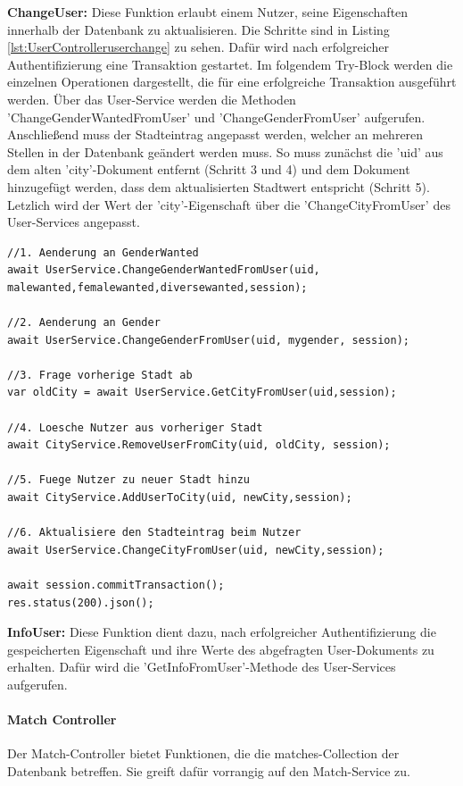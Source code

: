 \noindent
\textbf{ChangeUser:}
Diese Funktion erlaubt einem Nutzer, seine Eigenschaften innerhalb der Datenbank zu aktualisieren. Die Schritte sind in Listing \ref{lst:UserControlleruserchange} zu sehen. Dafür wird nach erfolgreicher Authentifizierung eine Transaktion gestartet. Im folgendem Try-Block werden die einzelnen Operationen dargestellt, die für eine erfolgreiche Transaktion ausgeführt werden. Über das User-Service werden die Methoden 'ChangeGenderWantedFromUser' und 'ChangeGenderFromUser' aufgerufen. Anschließend muss der Stadteintrag angepasst werden, welcher an  mehreren Stellen in der Datenbank geändert werden muss. 
So muss zunächst die 'uid' aus dem alten 'city'-Dokument entfernt (Schritt 3 und 4) und dem  Dokument hinzugefügt werden, dass dem aktualisierten Stadtwert entspricht (Schritt 5). Letzlich wird der Wert der 'city'-Eigenschaft über die 'ChangeCityFromUser' des User-Services angepasst.\\

\begin{lstlisting}[caption=UserController - Change User, label=lst:UserControlleruserchange]
//1. Aenderung an GenderWanted
await UserService.ChangeGenderWantedFromUser(uid, malewanted,femalewanted,diversewanted,session);

//2. Aenderung an Gender
await UserService.ChangeGenderFromUser(uid, mygender, session);

//3. Frage vorherige Stadt ab
var oldCity = await UserService.GetCityFromUser(uid,session);

//4. Loesche Nutzer aus vorheriger Stadt
await CityService.RemoveUserFromCity(uid, oldCity, session);

//5. Fuege Nutzer zu neuer Stadt hinzu
await CityService.AddUserToCity(uid, newCity,session);

//6. Aktualisiere den Stadteintrag beim Nutzer
await UserService.ChangeCityFromUser(uid, newCity,session);

await session.commitTransaction();
res.status(200).json();
\end{lstlisting}
  
\noindent
\textbf{InfoUser:}     
Diese Funktion dient dazu, nach erfolgreicher Authentifizierung die gespeicherten Eigenschaft und ihre Werte des abgefragten User-Dokuments zu erhalten. Dafür wird die 'GetInfoFromUser'-Methode des User-Services aufgerufen.
        

%
%


\paragraph{Match Controller}
Der Match-Controller bietet Funktionen, die die matches-Collection der Datenbank betreffen. Sie greift dafür vorrangig auf den Match-Service zu.\\

